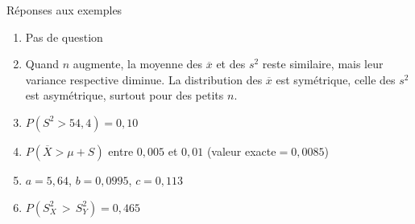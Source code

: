 \documentclass{BeamerTemplate}
\begin{document}

\begin{frame}[t]{Réponses aux exemples}

{\scriptsize
\begin{enumerate}
  \item Pas de question
  \item Quand $n$ augmente, la moyenne des $\overline x$ et des $s^2$ reste similaire, mais leur variance respective diminue. La distribution des $\overline x$ est symétrique, celle des $s^2$ est asymétrique, surtout pour des petits $n$.
  \item $P(S^2>54,4)=0,10$
  \item $P(\overline X>\mu+S)$ entre $0,005$ et $0,01$ (valeur exacte$=0,0085$)
  \item $a=5,64$, $b=0,0995$, $c=0,113$
  \item $P(S^2_X \,>\,S^2_Y)=0,465$
 \end{enumerate}
 }
\end{frame}
\end{document}
